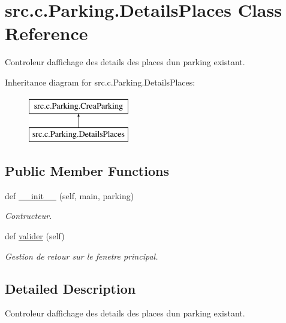 \hypertarget{classsrc_1_1c_1_1_parking_1_1_details_places}{}\section{src.\+c.\+Parking.\+Details\+Places Class Reference}
\label{classsrc_1_1c_1_1_parking_1_1_details_places}


Controleur d\textquotesingle{}affichage des details des places d\textquotesingle{}un parking existant.  


Inheritance diagram for src.\+c.\+Parking.\+Details\+Places\+:\begin{figure}[H]
\begin{center}
\leavevmode
\includegraphics[height=2.000000cm]{classsrc_1_1c_1_1_parking_1_1_details_places}
\end{center}
\end{figure}
\subsection*{Public Member Functions}
\begin{DoxyCompactItemize}
\item 
def \hyperlink{classsrc_1_1c_1_1_parking_1_1_details_places_a2aae7feef1ddd97b0f35a84385f94a0b}{\+\_\+\+\_\+init\+\_\+\+\_\+} (self, main, parking)
\begin{DoxyCompactList}\small\item\em Contructeur. \end{DoxyCompactList}\item 
\hypertarget{classsrc_1_1c_1_1_parking_1_1_details_places_a103db6144db04025efe6094318bc5593}{}def \hyperlink{classsrc_1_1c_1_1_parking_1_1_details_places_a103db6144db04025efe6094318bc5593}{valider} (self)\label{classsrc_1_1c_1_1_parking_1_1_details_places_a103db6144db04025efe6094318bc5593}

\begin{DoxyCompactList}\small\item\em Gestion de retour sur le fenetre principal. \end{DoxyCompactList}\end{DoxyCompactItemize}


\subsection{Detailed Description}
Controleur d\textquotesingle{}affichage des details des places d\textquotesingle{}un parking existant. 

